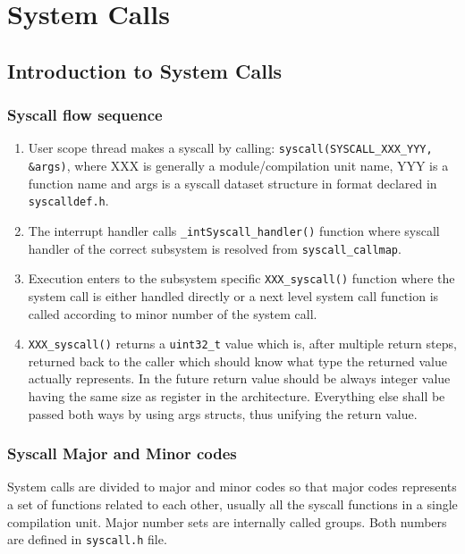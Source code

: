 \part{System Calls}

\chapter{Introduction to System Calls}

\section{Syscall flow sequence}

\begin{enumerate}
\item User scope thread makes a syscall by calling:
      \verb+syscall(SYSCALL_XXX_YYY, &args)+, where XXX is generally a
      module/compilation unit name, YYY is a function name and args is a
      syscall dataset structure in format declared in \verb+syscalldef.h+.

\item The interrupt handler calls \verb+_intSyscall_handler()+ function where
      syscall handler of the correct subsystem is resolved from
      \verb+syscall_callmap+.

\item Execution enters to the subsystem specific \verb+XXX_syscall()+
      function where the system call is either handled directly or a next level
      system call function is called according to minor number of
      the system call.

\item \verb+XXX_syscall()+ returns a \verb+uint32_t+ value which is, after
      multiple return steps, returned back to the caller which should know
      what type the returned value actually represents. In the future return
      value should be always integer value having the same size as register
      in the architecture. Everything else shall be passed both ways by using
      args structs, thus unifying the return value.
\end{enumerate}


\section{Syscall Major and Minor codes}

System calls are divided to major and minor codes so that major codes represents
a set of functions related to each other, usually all the syscall functions in a
single compilation unit. Major number sets are internally called groups. Both
numbers are defined in \verb+syscall.h+ file.


